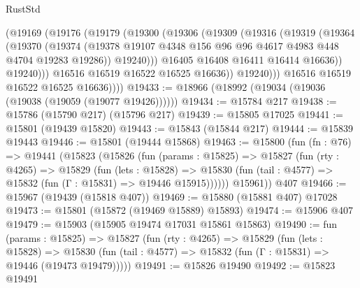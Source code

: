 \begin{lexlean}{RustStd}
\begin{coremodule}
                  (@19169
                    (@19176
                      (@19179
                        (@19300
                          (@19306
                            (@19309
                              (@19316
                                (@19319
                                  (@19364
                                    (@19370
                                      (@19374
                                        (@19378
                                          @19107
                                          @4348
                                          @156
                                          @96
                                          @96
                                          @4617
                                          @4983
                                          @448
                                          @4704
                                          @19283
                                          @19286))
                                      @19240)))
                                @16405
                                @16408
                                @16411
                                @16414
                                @16636))
                            @19240)))
                      @16516
                      @16519
                      @16522
                      @16525
                      @16636))
                  @19240)))
            @16516
            @16519
            @16522
            @16525
            @16636))))
@19433 := @18966 (@18992 (@19034 (@19036 (@19038 (@19059 (@19077 @19426))))))
@19434 := @15784 @217
@19438 := @15786 (@15790 @217) (@15796 @217)
@19439 := @15805 @17025
@19441 := @15801 (@19439 @15820)
@19443 := @15843 (@15844 @217)
@19444 := @15839 @19443
@19446 := @15801 (@19444 @15868)
@19463 := @15800
    (fun (fn : @76) =>
    @19441
      (@15823
        (@15826
          (fun (params : @15825) =>
          @15827
            (fun (rty : @4265) =>
            @15829
              (fun (lets : @15828) =>
              @15830 (fun (tail : @4577) => @15832 (fun (Γ : @15831) => @19446 @15915))))))
        @15961))
    @407
@19466 := @15967 (@19439 (@15818 @407))
@19469 := @15880 (@15881 @407) @17028
@19473 := @15801 (@15872 (@19469 @15889) @15893)
@19474 := @15906 @407
@19479 := @15903 (@15905 @19474 @17031 @15861 @15863)
@19490 := fun (params : @15825) =>
  @15827
    (fun (rty : @4265) =>
    @15829
      (fun (lets : @15828) =>
      @15830 (fun (tail : @4577) => @15832 (fun (Γ : @15831) => @19446 (@19473 @19479)))))
@19491 := @15826 @19490
@19492 := @15823 @19491

\end{coremodule}
\end{lexlean}

